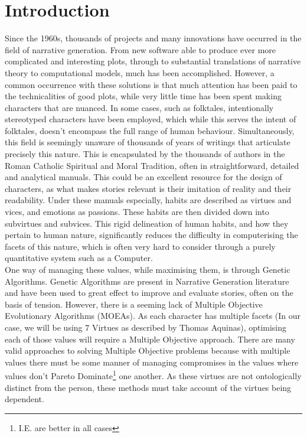 \documentclass[12pt]{article}
\begin{document}
\section{Introduction}
Since the 1960s, thousands of projects and many innovations have occurred in the field of narrative generation. From new software able to produce ever more complicated and interesting plots, through to substantial translations of narrative theory to computational models, much has been accomplished. However, a common occurrence with these solutions is that much attention has been paid to the technicalities of good plots, while very little time has been spent making characters that are nuanced. In some cases, such as folktales, intentionally stereotyped characters have been employed, which while this serves the intent of folktales, doesn't encompass the full range of human behaviour. Simultaneously, this field is seemingly unaware of thousands of years of writings that articulate precisely this nature. This is encapsulated by the thousands of authors in the Roman Catholic Spiritual and Moral Tradition, often in straightforward, detailed and analytical manuals. This could be an excellent resource for the design of characters, as what makes stories relevant is their imitation of reality and their readability. Under these manuals especially, habits are described as virtues and vices, and emotions as passions. These habits are then divided down into subvirtues and subvices. This rigid delineation of human habits, and how they pertain to human nature, significantly reduces the difficulty in computerising the facets of this nature, which is often very hard to consider through a purely quantitative system such as a Computer.  \\

One way of managing these values, while maximising them, is through Genetic Algorithms. Genetic Algorithms are present in Narrative Generation literature and have been used to great effect to improve and evaluate stories, often on the basis of tension. However, there is a seeming lack of Multiple Objective Evolutionary Algorithms (MOEAs). As each character has multiple facets (In our case, we will be using 7 Virtues as described by Thomas Aquinas), optimising each of those values will require a Multiple Objective approach. There are many valid approaches to solving Multiple Objective problems because with multiple values there must be some manner of managing compromises in the values where values don't Pareto Dominate\footnote{I.E. are better in all cases} one another. As these virtues are not ontologically distinct from the person, these methods must take account of the virtues being dependent. \\
\end{document}
